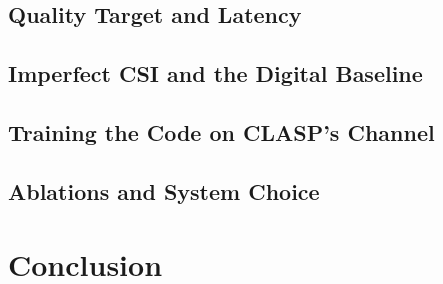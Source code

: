 \documentclass[lettersize,journal]{IEEEtran}
\begin{document}
\subsection{Quality Target and Latency}
\label{sec:eval-target}

\subsection{Imperfect CSI and the Digital Baseline}
\label{sec:eval-csi}

\subsection{Training the Code on CLASP's Channel}
\label{sec:eval-codesign}

\subsection{Ablations and System Choice}
\label{sec:eval-ablation}

\section{Conclusion}
\label{sec:conclusion}




\end{document}
